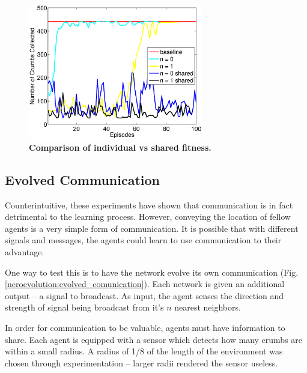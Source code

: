 \documentclass[conference]{IEEEtran}
\begin{document}
\begin{figure}[t]
\centering
\includegraphics[width=3.0in]{./figures/neroevolution/shared_result.eps}
\caption{\textbf{Comparison of individual vs shared fitness.}}
\label{neroevolution:shared_fitness}
\end{figure}

\subsection{Evolved Communication}

Counterintuitive, these experiments have shown that communication is in fact detrimental to the learning process.
However, conveying the location of fellow agents is a very simple form of communication. It is possible that with different signals and messages, the agents could learn to use communication to their advantage.

One way to test this is to have the network evolve its own communication (Fig. \ref{neroevolution:evolved_comunication}). Each network is given an additional output -- a signal to broadcast. As input, the agent senses the direction and strength of signal being broadcast from it's $n$ nearest neighbors. 

In order for communication to be valuable, agents must have information to share. 
Each agent is equipped with a sensor which detects how many crumbs are within a small radius. A radius of 1/8 of the length of the environment was chosen through experimentation -- larger radii rendered the sensor useless.
\end{document}
